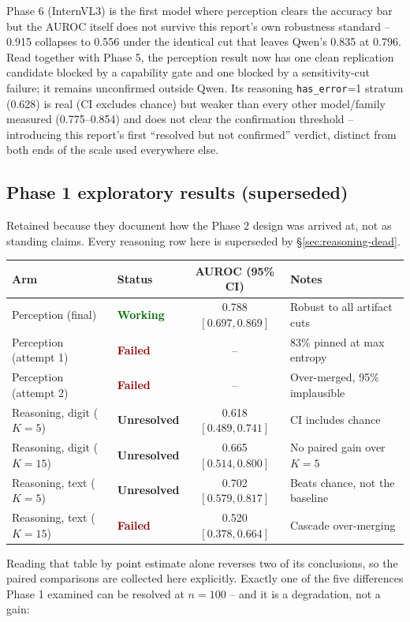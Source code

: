 \documentclass[11pt]{article}
\newcommand{\worked}[1]{\textcolor{darkgreen}{\textbf{#1}}}
\newcommand{\failed}[1]{\textcolor{darkred}{\textbf{#1}}}
\newcommand{\unresolved}[1]{\textcolor{darkamber}{\textbf{#1}}}
\begin{document}
Phase 6 (InternVL3) is the first model where perception clears the
accuracy bar but the AUROC itself does not survive this report's own
robustness standard -- 0.915 collapses to 0.556 under the identical cut
that leaves Qwen's 0.835 at 0.796. Read together with Phase 5, the
perception result now has one clean replication candidate blocked by a
capability gate and one blocked by a sensitivity-cut failure; it remains
unconfirmed outside Qwen. Its reasoning \texttt{has\_error}=1 stratum
(0.628) is real (CI excludes chance) but weaker than every other
model/family measured (0.775--0.854) and does not clear the confirmation
threshold -- introducing this report's first ``resolved but not
confirmed'' verdict, distinct from both ends of the scale used everywhere
else.

\subsection{Phase 1 exploratory results (superseded)}

Retained because they document how the Phase 2 design was arrived at, not as
standing claims. Every reasoning row here is superseded by
\S\ref{sec:reasoning-dead}.

\begin{center}
\begin{tabular}{llcl}
\toprule
Arm & Status & AUROC (95\% CI) & Notes \\
\midrule
Perception (final) & \worked{Working} & 0.788 $[0.697, 0.869]$ & Robust to all artifact cuts \\
Perception (attempt 1) & \failed{Failed} & -- & 83\% pinned at max entropy \\
Perception (attempt 2) & \failed{Failed} & -- & Over-merged, 95\% implausible \\
Reasoning, digit ($K=5$) & \unresolved{Unresolved} & 0.618 $[0.489, 0.741]$ & CI includes chance \\
Reasoning, digit ($K=15$) & \unresolved{Unresolved} & 0.665 $[0.514, 0.800]$ & No paired gain over $K=5$ \\
Reasoning, text ($K=5$) & \unresolved{Unresolved} & 0.702 $[0.579, 0.817]$ & Beats chance, not the baseline \\
Reasoning, text ($K=15$) & \failed{Failed} & 0.520 $[0.378, 0.664]$ & Cascade over-merging \\
\bottomrule
\end{tabular}
\end{center}

Reading that table by point estimate alone reverses two of its conclusions, so
the paired comparisons are collected here explicitly. Exactly one of the five
differences Phase 1 examined can be resolved at $n=100$ -- and it is a
degradation, not a gain:
\end{document}
